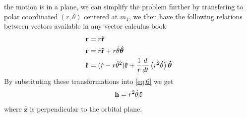 the motion is in a plane, we can simplify the problem further by transfering
to polar coordinated $(r,\theta)$ centered at $m_1$, we then have the following
relations between vectors available in any vector calculus book
\begin{align}
\boldsymbol{\mathbf{r}} &=r\boldsymbol{\mathbf{\hat{r}}}\\
    \dot{\boldsymbol{\mathbf{r}}} &= \dot{r}\boldsymbol{\mathbf{\hat{r}}} + r\dot{\theta}\boldsymbol{\hat\theta}\\
    \ddot{\boldsymbol{\mathbf{r}}} &= (\dot{r} - r\dot{\theta}^2)\boldsymbol{\mathbf{\hat{r}}} + \frac{1}{r} 
    \frac{d}{dt}\left(r^2\dot{\theta}\right)\boldsymbol{\hat\theta}\label{eq:9}
\end{align}
By substituting these transformations into \cref{eq:6} we get
\begin{equation}
\boldsymbol{\mathbf{h}}=r^2\dot{\theta}\boldsymbol{\hat z}
    \label{eq:10}
\end{equation}
where $\boldsymbol{\hat z}$ is perpendicular to the orbital plane. 

